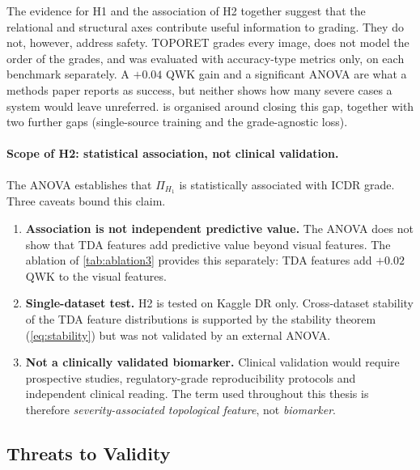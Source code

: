 The evidence for H1 and the association of H2 together suggest that the relational and
structural axes contribute useful information to grading. They do not, however, address safety. TOPORET grades every
image, does not model the order of the grades, and was evaluated with accuracy-type
metrics only, on each benchmark separately. A $+0.04$ QWK gain and a significant ANOVA
are what a methods paper reports as success, but neither shows how many severe cases a
system would leave unreferred.  is organised around closing this gap,
together with two further gaps (single-source training and the grade-agnostic loss).

\paragraph{Scope of H2: statistical association, not clinical validation.}
The ANOVA establishes that $\Pi_{H_1}$ is statistically associated with ICDR grade. Three
caveats bound this claim.
\begin{enumerate}
\item \textbf{Association is not independent predictive value.} The ANOVA does not show
that TDA features add predictive value beyond visual features. The ablation of
\cref{tab:ablation3} provides this separately: TDA features add $+0.02$ QWK to the visual
features.
\item \textbf{Single-dataset test.} H2 is tested on Kaggle DR only. Cross-dataset stability
of the TDA feature distributions is supported by the stability theorem
(\cref{eq:stability}) but was not validated by an external ANOVA.
\item \textbf{Not a clinically validated biomarker.} Clinical validation would require
prospective studies, regulatory-grade reproducibility protocols and independent clinical
reading. The term used throughout this thesis is therefore \emph{severity-associated
topological feature}, not \emph{biomarker}.
\end{enumerate}

\subsection{Threats to Validity}
\label{sec:ch3-validity}

